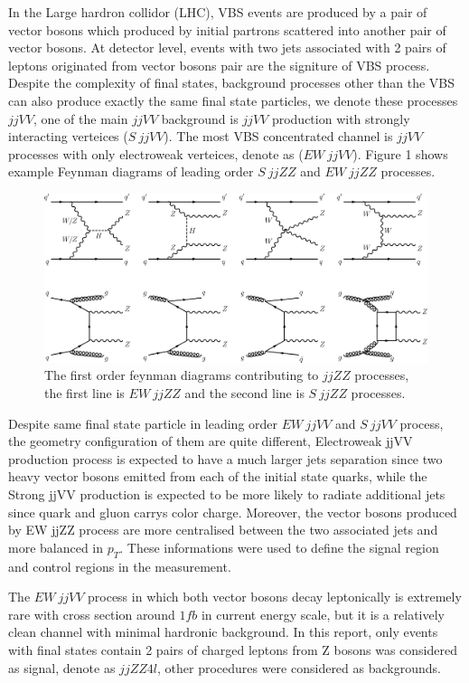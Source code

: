 \documentclass[12pt]{article}
\begin{document}
        \par \noindent In the Large hardron collidor (LHC), VBS events are produced by a pair of vector bosons which produced by initial partrons scattered into another
        pair of vector bosons. At detector level, events with two jets associated with 2 pairs of leptons originated from vector bosons pair are the signiture of
        VBS process. Despite the complexity of final states, background processes other than the VBS can also produce exactly the same final state particles, we
        denote these processes $jjVV$, one of the main $jjVV$ background is $jjVV$ production with strongly interacting verteices ($S\ jjVV$). The most VBS concentrated 
        channel is $jjVV$ processes with only electroweak verteices, denote as ($EW\ jjVV$). Figure 1 shows example Feynman diagrams of leading order $S\ jjZZ$ and $EW\ jjZZ$ processes\cite{ATLAS-CONF-2019-033}.
        \begin{figure}[ht]
            \begin{centering}
            \includegraphics[scale=0.42]{Feynman_diag.png}
            \caption{The first order feynman diagrams contributing to $jjZZ$ processes, the first line is $EW\ jjZZ$ and the second line is $S\ jjZZ$ processes.}
            \end{centering}
        \end{figure}
        \par Despite same final state particle in leading order $EW\ jjVV$ and $S\ jjVV$ process, the geometry configuration of them are quite different, 
        Electroweak jjVV production process is expected to have a much larger jets separation since two heavy vector bosons emitted from each of the initial state 
        quarks, while the Strong jjVV production is expected to be more likely to radiate additional jets since quark and gluon carrys color charge. Moreover, the vector
        bosons  produced by EW jjZZ process are more centralised between the two associated jets and more balanced in $p_T$. These informations were used to define the
        signal region and control regions in the measurement.
        \par The $EW\ jjVV$ process in which both vector bosons decay leptonically is extremely rare with cross section around $1fb$ in current energy scale, but it is a relatively 
        clean channel with minimal hardronic background. In this report, only events with final states contain 2 pairs of charged leptons from Z bosons was considered as signal, denote as $jjZZ4l$,
        other procedures were considered as backgrounds.
\end{document}
